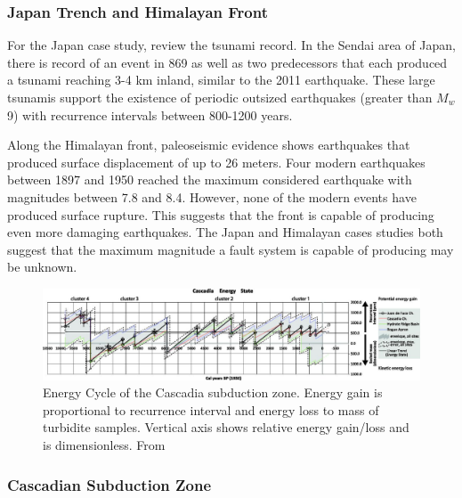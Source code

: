 \documentclass[]{proposalnsf}
\begin{document}
\subsubsection{Japan Trench and Himalayan Front}

For the Japan case study, \citet{Goldfinger2013} review the tsunami record. In the Sendai area of Japan, there is record of an event in 869 as well as two predecessors that each produced a tsunami reaching 3-4 km inland, similar to the 2011 earthquake. These large tsunamis support the existence of periodic outsized earthquakes (greater than $M_w$ 9) with recurrence intervals between 800-1200 years. 

Along the Himalayan front, paleoseismic evidence shows earthquakes that produced surface displacement of up to 26 meters.  Four modern earthquakes between 1897 and 1950 reached the maximum considered earthquake with magnitudes between 7.8 and 8.4. However, none of the modern events have produced surface rupture. This suggests that the front is capable of producing even more damaging earthquakes. The Japan and Himalayan cases studies both suggest that the maximum magnitude a fault system is capable of producing may be unknown. 

\begin{figure}
	\includegraphics[width=1\linewidth]{./Figures/Goldfinger/F4large.jpg}
	\caption{Energy Cycle of the Cascadia subduction zone. Energy gain is proportional to recurrence interval and energy loss to mass of turbidite samples. Vertical axis shows relative energy gain/loss and is dimensionless. From \citet{Goldfinger2013}}
	\label{fig:energyCycle}
\end{figure}

\subsubsection{Cascadian Subduction Zone}
\end{document}
